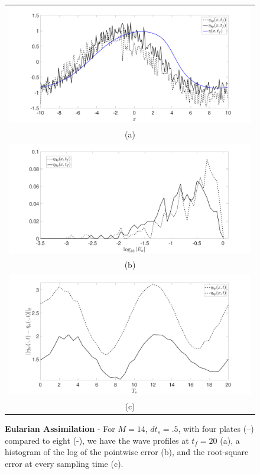 \begin{figure}
\centering
\begin{tabular}{c}
\includegraphics[width=.95\textwidth]{Images/wave_tf_20_sig_pt1_4_vs8pplates_Mval_14} \\
(a)\\
\includegraphics[width=.95\textwidth]{Images/histogram_tf_20_sig_pt1_4_vs8pplates_Mval_14}\\
(b)\\
\includegraphics[width=.95\textwidth]{Images/rmserr_tf_20_sig_pt1_4_vs8pplates_Mval_14}\\
(c)
\end{tabular}
\caption{{\bf Eularian Assimilation} - For $M=14$, $dt_{s}=.5$, with four plates (--) compared to eight (-), we have the wave profiles at $t_{f}=20$ (a), a histogram of the log of the pointwise error (b), and the root-square error at every sampling time (c).} 
\label{fig:Mval_14}
\end{figure}

